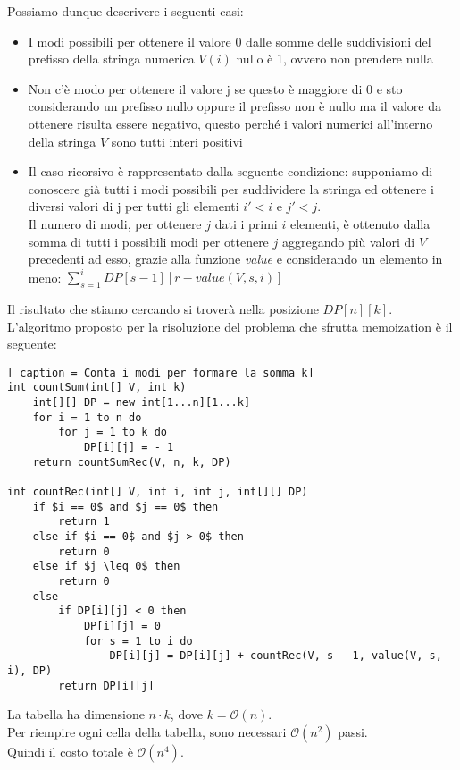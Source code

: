 \documentclass[../cheatSheetAlgoritmi.tex]{subfiles}
\begin{document}
Possiamo dunque descrivere i seguenti casi: 
\begin{itemize}
		\item I modi possibili per ottenere il valore 0 dalle somme delle suddivisioni del prefisso della stringa numerica $V(i)$ nullo è 1, ovvero non prendere nulla
		\item Non c'è modo per ottenere il valore j se questo è maggiore di 0 e sto considerando un prefisso nullo oppure il prefisso non è nullo ma il valore da ottenere risulta essere negativo, questo perché i valori numerici all'interno della stringa $V$ sono tutti interi positivi
		\item Il caso ricorsivo è rappresentato dalla seguente condizione: supponiamo di conoscere già tutti i modi possibili per suddividere la stringa ed ottenere i diversi valori di j per tutti gli elementi $i' < i$ e $j' < j$. \\ Il numero di modi, per ottenere $j$ dati i primi $i$ elementi, è ottenuto dalla somma di tutti i possibili modi per ottenere $j$ aggregando più valori di $V$ precedenti ad esso, grazie alla funzione \emph{value} e considerando un elemento in meno: $\sum_{s = 1}^{i} DP[s - 1][r - value(V, s, i)]$
\end{itemize}
Il risultato che stiamo cercando si troverà nella posizione $DP[n][k]$. \\
L'algoritmo proposto per la risoluzione del problema che sfrutta memoization è il seguente:
\newpage
\begin{lstlisting}[ caption = Conta i modi per formare la somma k]
int countSum(int[] V, int k)
	int[][] DP = new int[1...n][1...k]
	for i = 1 to n do
		for j = 1 to k do
			DP[i][j] = - 1
	return countSumRec(V, n, k, DP)

int countRec(int[] V, int i, int j, int[][] DP)
	if $i == 0$ and $j == 0$ then
		return 1
	else if $i == 0$ and $j > 0$ then
		return 0
	else if $j \leq 0$ then
		return 0
	else 
		if DP[i][j] < 0 then
			DP[i][j] = 0
			for s = 1 to i do
				DP[i][j] = DP[i][j] + countRec(V, s - 1, value(V, s, i), DP)
		return DP[i][j]
\end{lstlisting}
La tabella ha dimensione $n \cdot k$, dove $k = \mathcal{O}(n)$. \\ 
Per riempire ogni cella della tabella, sono necessari $\mathcal{O}(n^2)$ passi. \\ Quindi il costo totale è $\mathcal{O}(n^4)$. 
\newpage
\end{document}
